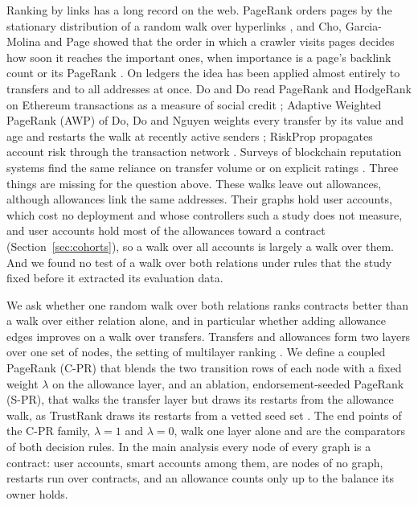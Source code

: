 \documentclass{ieeeaccess}
\newcommand{\cpr}{\mbox{C-PR}}
\newcommand{\spr}{\mbox{S-PR}}
\begin{document}
Ranking by links has a long record on the web. PageRank orders pages by the stationary distribution of a random walk over hyperlinks \cite{page1999pagerank}, and Cho, Garcia-Molina and Page showed that the order in which a crawler visits pages decides how soon it reaches the important ones, when importance is a page's backlink count or its PageRank \cite{cho1998crawling}. On ledgers the idea has been applied almost entirely to transfers and to all addresses at once. Do and Do read PageRank and HodgeRank on Ethereum transactions as a measure of social credit \cite{do2023hodgerank}; Adaptive Weighted PageRank (AWP) of Do, Do and Nguyen weights every transfer by its value and age and restarts the walk at recently active senders \cite{do2023awp}; RiskProp propagates account risk through the transaction network \cite{lin2025riskprop}. Surveys of blockchain reputation systems find the same reliance on transfer volume or on explicit ratings \cite{bellini2020trust}. Three things are missing for the question above. These walks leave out allowances, although allowances link the same addresses. Their graphs hold user accounts, which cost no deployment and whose controllers such a study does not measure, and user accounts hold most of the allowances toward a contract (Section~\ref{sec:cohorts}), so a walk over all accounts is largely a walk over them. And we found no test of a walk over both relations under rules that the study fixed before it extracted its evaluation data.

We ask whether one random walk over both relations ranks contracts better than a walk over either relation alone, and in particular whether adding allowance edges improves on a walk over transfers. Transfers and allowances form two layers over one set of nodes, the setting of multilayer ranking \cite{halu2013multiplex,dedomenico2015ranking}. We define a coupled PageRank (\cpr{}) that blends the two transition rows of each node with a fixed weight $\lambda$ on the allowance layer, and an ablation, endorsement-seeded PageRank (\spr{}), that walks the transfer layer but draws its restarts from the allowance walk, as TrustRank draws its restarts from a vetted seed set \cite{gyongyi2004trustrank}. The end points of the \cpr{} family, $\lambda=1$ and $\lambda=0$, walk one layer alone and are the comparators of both decision rules. In the main analysis every node of every graph is a contract: user accounts, smart accounts among them, are nodes of no graph, restarts run over contracts, and an allowance counts only up to the balance its owner holds.
\end{document}
